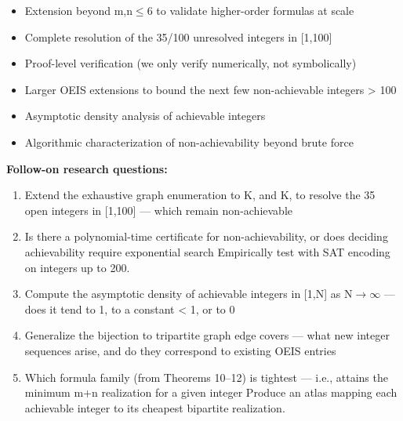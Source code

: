 \documentclass[11pt]{article}
\begin{document}
\begin{itemize}[leftmargin=1.4em,itemsep=0.2em,topsep=0.2em]
\item Extension beyond m,n$\leq$6 to validate higher-order formulas at scale
\item Complete resolution of the 35/100 unresolved integers in [1,100]
\item Proof-level verification (we only verify numerically, not symbolically)
\item Larger OEIS extensions to bound the next few non-achievable integers \textgreater{} 100
\item Asymptotic density analysis of achievable integers
\item Algorithmic characterization of non-achievability beyond brute force
\end{itemize}\noindent\textbf{Follow-on research questions:}
\begin{enumerate}[leftmargin=1.6em,itemsep=0.2em,topsep=0.2em,label=Q\arabic*.]
\item Extend the exhaustive graph enumeration to K, and K, to resolve the 35 open integers in [1,100] --- which remain non-achievable
\item Is there a polynomial-time certificate for non-achievability, or does deciding achievability require exponential search Empirically test with SAT encoding on integers up to 200.
\item Compute the asymptotic density of achievable integers in [1,N] as N$\rightarrow$$\infty$ --- does it tend to 1, to a constant \textless{} 1, or to 0
\item Generalize the bijection to tripartite graph edge covers --- what new integer sequences arise, and do they correspond to existing OEIS entries
\item Which formula family (from Theorems 10--12) is tightest --- i.e., attains the minimum m+n realization for a given integer Produce an atlas mapping each achievable integer to its cheapest bipartite realization.
\end{enumerate}
\end{document}
